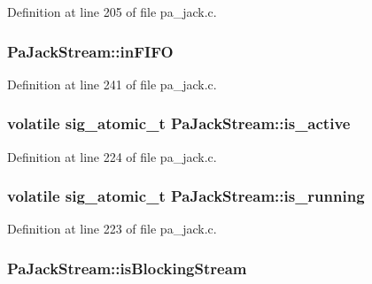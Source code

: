 Definition at line 205 of file pa\+\_\+jack.\+c.

\subsubsection[{\texorpdfstring{in\+F\+I\+FO}{inFIFO}}]{ Pa\+Jack\+Stream\+::in\+F\+I\+FO}\hypertarget{struct_pa_jack_stream_a7eabd09f0955039b4c6e898b67485115}{}\label{struct_pa_jack_stream_a7eabd09f0955039b4c6e898b67485115}


Definition at line 241 of file pa\+\_\+jack.\+c.

\subsubsection[{\texorpdfstring{is\+\_\+active}{is_active}}]{\setlength{\rightskip}{0pt plus 5cm}volatile sig\+\_\+atomic\+\_\+t Pa\+Jack\+Stream\+::is\+\_\+active}\hypertarget{struct_pa_jack_stream_aa76032f188b70106c516f6e899f093c2}{}\label{struct_pa_jack_stream_aa76032f188b70106c516f6e899f093c2}


Definition at line 224 of file pa\+\_\+jack.\+c.

\subsubsection[{\texorpdfstring{is\+\_\+running}{is_running}}]{\setlength{\rightskip}{0pt plus 5cm}volatile sig\+\_\+atomic\+\_\+t Pa\+Jack\+Stream\+::is\+\_\+running}\hypertarget{struct_pa_jack_stream_a06646e9c971d3bb6df4b388069f7b028}{}\label{struct_pa_jack_stream_a06646e9c971d3bb6df4b388069f7b028}


Definition at line 223 of file pa\+\_\+jack.\+c.

\subsubsection[{\texorpdfstring{is\+Blocking\+Stream}{isBlockingStream}}]{ Pa\+Jack\+Stream\+::is\+Blocking\+Stream}\hypertarget{struct_pa_jack_stream_a82443cba3e6baf5cfe78b117bd0824d1}{}\label{struct_pa_jack_stream_a82443cba3e6baf5cfe78b117bd0824d1}


